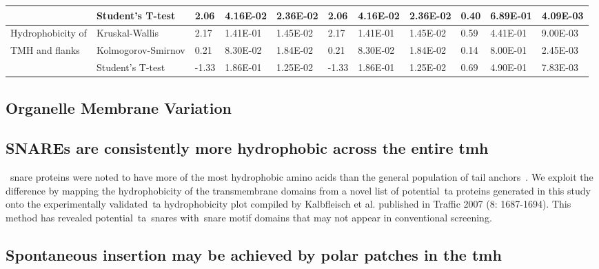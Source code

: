 \begin{table}[htbp]
{\begin{tabular}{lllllllllll}
	                                                  & Student's T-test                  & 2.06           & 4.16E-02 & 2.36E-02      & 2.06           & 4.16E-02 & 2.36E-02      & 0.40           & 6.89E-01 & 4.09E-03      \\
	\midrule
	\multirow{1}{*}{Hydrophobicity of}	 							& Kruskal-Wallis                    & 2.17           & 1.41E-01 & 1.45E-02      & 2.17           & 1.41E-01 & 1.45E-02      & 0.59           & 4.41E-01 & 9.00E-03      \\
	\multirow{2}{*}{TMH and flanks}                   & Kolmogorov-Smirnov                & 0.21           & 8.30E-02 & 1.84E-02      & 0.21           & 8.30E-02 & 1.84E-02      & 0.14           & 8.00E-01 & 2.45E-03      \\
	                                                  & Student's T-test                  & -1.33          & 1.86E-01 & 1.25E-02      & -1.33          & 1.86E-01 & 1.25E-02      & 0.69           & 4.90E-01 & 7.83E-03			\\

	\bottomrule
	\end{tabular}%
	}
	\label{table:speciestableuniprotstats}
\end{table}%

\subsection{Organelle Membrane Variation}

\subsection{SNAREs are consistently more hydrophobic across the entire \gls{tmh}}

~\gls{snare} proteins were noted to have more of the most hydrophobic amino acids than the general population of tail anchors~\cite{Kalbfleisch2007}.
We exploit the difference by mapping the hydrophobicity of the transmembrane domains from a novel list of potential~\gls{ta} proteins generated in this study onto the experimentally validated~\gls{ta} hydrophobicity plot compiled by Kalbfleisch et al. published in Traffic 2007 (8: 1687-1694).
This method has revealed potential~\gls{ta}~\gls{snare}s with~\gls{snare} motif domains that may not appear in conventional screening.

\subsection{Spontaneous insertion may be achieved by polar patches in the \gls{tmh}}

